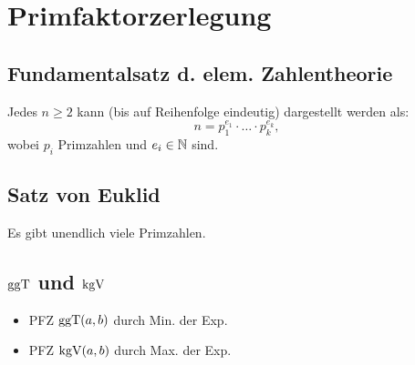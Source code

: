 \section*{Primfaktorzerlegung}

\subsection*{Fundamentalsatz d. elem. Zahlentheorie}
Jedes $n \ge 2$ kann (bis auf Reihenfolge eindeutig) dargestellt werden als:
\[n = p_1^{e_1} \cdot \ldots \cdot p_k^{e_k},\]
wobei $p_i$ Primzahlen und $e_i\in\mathbb{N}$ sind.

\subsection*{Satz von Euklid}
Es gibt unendlich viele Primzahlen.

\subsection*{$\operatorname{ggT}$ und $\operatorname{kgV}$}
\begin{itemize}
	\item PFZ $\operatorname{ggT}(a,b)$ durch Min. der Exp.
	\item PFZ $\operatorname{kgV}(a,b)$ durch Max. der Exp.
\end{itemize}
